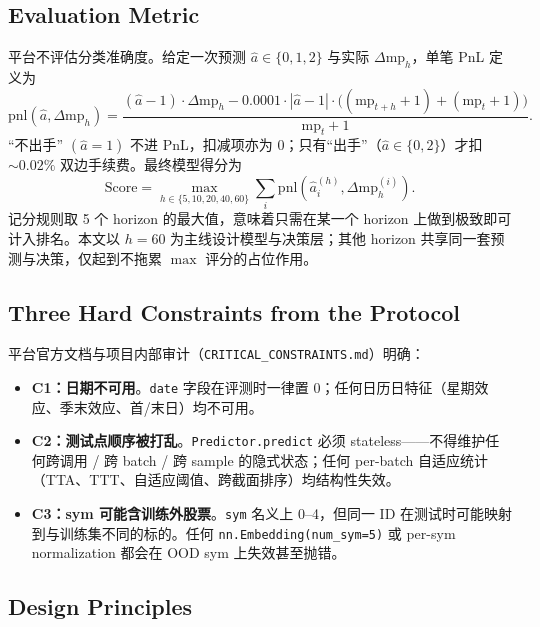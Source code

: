 \documentclass[11pt]{article}
\begin{document}
\subsection{Evaluation Metric}

平台不评估分类准确度。给定一次预测 $\hat a\in\{0,1,2\}$ 与实际 $\Delta\mathrm{mp}_h$，单笔 PnL 定义为
\begin{equation}
\mathrm{pnl}(\hat a, \Delta\mathrm{mp}_h) = \frac{(\hat a-1)\cdot\Delta\mathrm{mp}_h - 0.0001\cdot|\hat a-1|\cdot\big((\mathrm{mp}_{t+h}{+}1)+(\mathrm{mp}_t{+}1)\big)}{\mathrm{mp}_t + 1}.
\end{equation}
``不出手'' $(\hat a=1)$ 不进 PnL，扣减项亦为 0；只有``出手''（$\hat a\in\{0,2\}$）才扣 $\sim 0.02\%$ 双边手续费。最终模型得分为
\begin{equation}
\mathrm{Score} = \max_{h\in\{5,10,20,40,60\}} \sum_i \mathrm{pnl}(\hat a_i^{(h)}, \Delta\mathrm{mp}_h^{(i)}).
\end{equation}
记分规则取 5 个 horizon 的最大值，意味着只需在某一个 horizon 上做到极致即可计入排名。本文以 $h=60$ 为主线设计模型与决策层；其他 horizon 共享同一套预测与决策，仅起到不拖累 $\max$ 评分的占位作用。

\subsection{Three Hard Constraints from the Protocol}

平台官方文档与项目内部审计（\texttt{CRITICAL\_CONSTRAINTS.md}）明确：
\begin{itemize}
  \item \textbf{C1：日期不可用}。\texttt{date} 字段在评测时一律置 0；任何日历日特征（星期效应、季末效应、首/末日）均不可用。
  \item \textbf{C2：测试点顺序被打乱}。\texttt{Predictor.predict} 必须 stateless——不得维护任何跨调用 / 跨 batch / 跨 sample 的隐式状态；任何 per-batch 自适应统计（TTA、TTT、自适应阈值、跨截面排序）均结构性失效。
  \item \textbf{C3：sym 可能含训练外股票}。\texttt{sym} 名义上 0--4，但同一 ID 在测试时可能映射到与训练集不同的标的。任何 \texttt{nn.Embedding(num\_sym=5)} 或 per-sym normalization 都会在 OOD sym 上失效甚至抛错。
\end{itemize}

\subsection{Design Principles}
\label{sec:principles}
\end{document}

